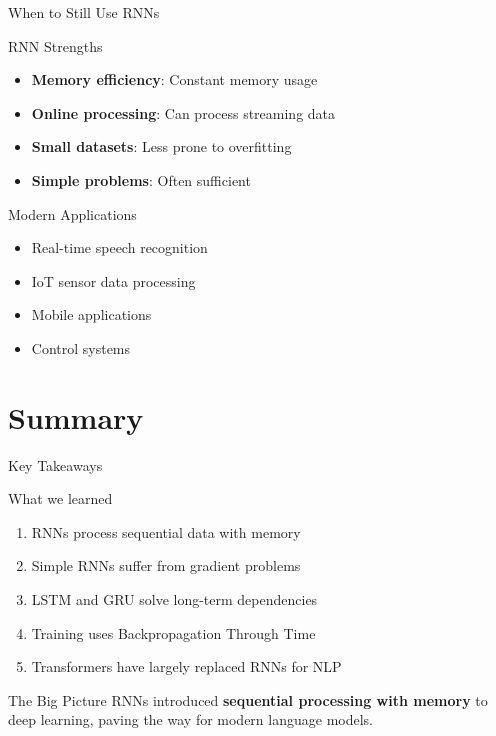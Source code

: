 \documentclass[usenames,dvipsnames]{beamer}
\begin{document}
	\begin{frame}{When to Still Use RNNs}
		\footnotesize
		\begin{definitionbox}{RNN Strengths}
			\begin{itemize}
				\item \textbf{Memory efficiency}: Constant memory usage
				\item \textbf{Online processing}: Can process streaming data
				\item \textbf{Small datasets}: Less prone to overfitting
				\item \textbf{Simple problems}: Often sufficient
			\end{itemize}
		\end{definitionbox}
		
		\begin{examplebox}{Modern Applications}
			\begin{itemize}
				\item Real-time speech recognition
				\item IoT sensor data processing  
				\item Mobile applications
				\item Control systems
			\end{itemize}
		\end{examplebox}
	\end{frame}
	
	\section{Summary}
	
	\begin{frame}{Key Takeaways}
		\begin{keypointsbox}{What we learned}
			\begin{enumerate}
				\item RNNs process sequential data with memory
				\item Simple RNNs suffer from gradient problems
				\item LSTM and GRU solve long-term dependencies
				\item Training uses Backpropagation Through Time
				\item Transformers have largely replaced RNNs for NLP
			\end{enumerate}
		\end{keypointsbox}
		
		\begin{theorembox}{The Big Picture}
			RNNs introduced \textbf{sequential processing with memory} to deep learning, paving the way for modern language models.
		\end{theorembox}
	\end{frame}
\end{document}
